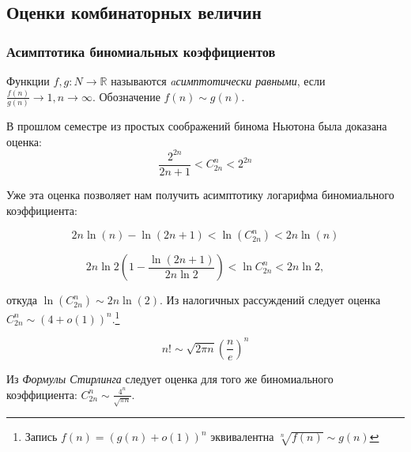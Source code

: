 \subsection{Оценки комбинаторных величин}

\subsubsection{Асимптотика биномиальных коэффициентов}

\begin{Def}
	Функции $f, g:N \rightarrow \mathbb{R}$ называются \emph{aсимптотически равными}, если \(\frac{f(n)}{g(n)} \rightarrow 1, n \rightarrow \infty \). Обозначение \(f(n) \sim g(n)\).
\end{Def}


\begin{example}
	В прошлом семестре из простых соображений бинома Ньютона была доказана оценка:
	\[ \frac{2^{2n}}{2n + 1} < C^n_{2n} < 2^{2n} \]
	
	Уже эта оценка позволяет нам получить асимптотику логарифма биномиального коэффициента:
	
	\[ 2n\ln(n) - \ln(2n+1) < \ln(C^n_{2n}) < 2n\ln(n) \]
	
	
	\[2 n \ln 2\left(1-\frac{\ln (2 n+1)}{2 n \ln 2}\right) < \ln C_{2 n}^{n} < 2n \ln 2, \]
	
	
	откуда \( \ln(C^n_{2n}) \sim 2n\ln(2) \).
	Из налогичных рассуждений следует оценка \(C^n_{2n} \sim \left(4 + o(1)\right)^n\).\footnote{Запись $f\left( n\right) = \left( g\left( n\right) + o\left( 1\right) \right) ^n $ эквивалентна $\sqrt[n]{f(n)} \sim g\left( n\right) $}
\end{example}


\begin{theorem}
	\[ n! \sim \sqrt{2\pi n} (\frac{n}{e})^n \]
\end{theorem}

\begin{note}
	Из \emph{Формулы Стирлинга} следует оценка для того же биномиального коэффициента: \(C^n_{2n} \sim \frac{4^n}{\sqrt{\pi n}}\).
\end{note}

